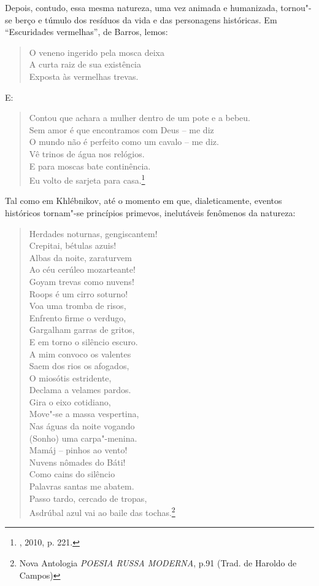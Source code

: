 Depois, contudo, essa mesma natureza, uma vez animada e humanizada,
tornou"-se berço e túmulo dos resíduos da vida e das personagens
históricas. Em ``Escuridades vermelhas'', de Barros, lemos:

\begin{verse}
O veneno ingerido pela mosca deixa \\
A curta raiz de sua existência \\
Exposta às vermelhas trevas.
\end{verse}

E:

\begin{verse}
Contou que achara a mulher dentro de um \qb{}pote e a bebeu. \\
Sem amor é que encontramos com Deus -- \qb{}me diz \\
O mundo não é perfeito como um cavalo -- \qb{}me diz. \\
Vê trinos de água nos relógios. \\
E para moscas bate continência. \\
Eu volto de sarjeta para casa.\footnote{, 2010, p. 221.}
\end{verse}

Tal como em Khlébnikov, até o momento em que, dialeticamente, eventos
históricos tornam"-se princípios primevos, inelutáveis fenômenos da
natureza:

\begin{verse}
Herdades noturnas, gengiscantem! \\
Crepitai, bétulas azuis! \\
Albas da noite, zaraturvem \\
Ao céu cerúleo mozarteante! \\
Goyam trevas como nuvens! \\
Roops é um cirro soturno! \\
Voa uma tromba de risos, \\
Enfrento firme o verdugo, \\
Gargalham garras de gritos, \\
E em torno o silêncio escuro. \\
A mim convoco os valentes \\
Saem dos rios os afogados, \\
O miosótis estridente, \\
Declama a velames pardos. \\
Gira o eixo cotidiano, \\
Move"-se a massa vespertina, \\
Nas águas da noite vogando \\
(Sonho) uma carpa"-menina. \\
Mamáj -- pinhos ao vento! \\
Nuvens nômades do Báti! \\
Como cains do silêncio \\
Palavras santas me abatem. \\
Passo tardo, cercado de tropas, \\
Asdrúbal azul vai ao baile das tochas.\footnote{Nova Antologia
  \emph{POESIA RUSSA MODERNA}, p.91 (Trad. de Haroldo de Campos)}
  \end{verse}

